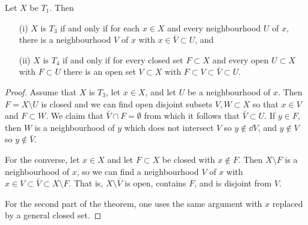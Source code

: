 \begin{lem}
  \label{separation-squeeze-lemma}
  Let $X$ be $T_1$. Then
  \begin{itemize}
    \item[(i)] $X$ is $T_3$ if and only if for each $x \in X$ and every neighbourhood $U$ of $x$, there is a neighbourhood $V$ of $x$ with $x \in \bar V \subset U$, and
    \item[(ii)] $X$ is $T_4$ if and only if for every closed set $F \subset X$ and every open $U \subset X$ with $F \subset U$ there is an open set $V \subset X$ with $F \subset V \subset \bar V \subset U$.
  \end{itemize}
\end{lem}
\begin{proof}
  Assume that $X$ is $T_3$, let $x \in X$, and let $U$ be a neighbourhood of $x$. Then $F = X \setminus U$ is closed and we can find open disjoint subsets $V,W \subset X$ so that $x \in V$ and $F \subset W$. We claim that $\bar V \cap F = \emptyset$ from which it follows that $\bar V \subset U$. If $y \in F$, then $W$ is a neighbourhood of $y$ which does not intersect $V$ so $y \notin \dd V$, and $y \notin V$ so $y \notin \bar V$.
  
  For the converse, let $x \in X$ and let $F \subset X$ be closed with $x \notin F$. Then $X \setminus F$ is a neighbourhood of $x$, so we can find a neighbourhood $V$ of $x$ with $x \in V \subset \bar V \subset X \setminus F$. That is, $X \setminus \bar V$ is open, contains $F$, and is disjoint from $V$.
  
  For the second part of the theorem, one uses the same argument with $x$ replaced by a general closed set.
\end{proof}

